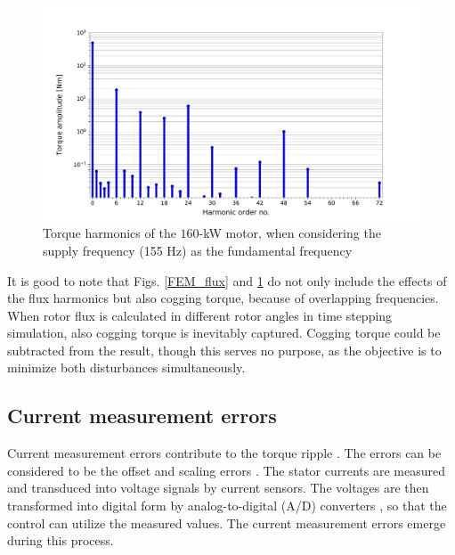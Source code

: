 \begin{figure}[ht] 
    \centering
    \includegraphics[width=1.0\linewidth]{images/fem-flux-harmonics.pdf} 
    \caption{Torque harmonics of the $160$-kW motor, when considering the supply frequency (155 Hz) as the fundamental frequency}
    \label{FEM_flux_harmonics}
\end{figure}

It is good to note that Figs. \ref{FEM_flux} and \ref{FEM_flux_harmonics} do not only include the effects of the flux harmonics but also cogging torque, because of overlapping frequencies. When rotor flux is calculated in different rotor angles in time stepping simulation, also cogging torque is inevitably captured. Cogging torque could be subtracted from the result, though this serves no purpose, as the objective is to minimize both disturbances simultaneously.


\subsection{Current measurement errors}
Current measurement errors contribute to the torque ripple \cite{current_scaling:1998, ILC:2004, ILC:2005, CTR_SW_ff:2011, ILC:2012, ILC:2018}. The errors can be considered to be the offset and scaling errors \cite{current_scaling:1998, ILC:2004, CTR_SW_ff:2011, ILC:2012}. The stator currents are measured and transduced into voltage signals by current sensors. The voltages are then transformed into digital form by analog-to-digital (A/D) converters \cite{current_scaling:1998, ILC:2005}, so that the control can utilize the measured values. The current measurement errors emerge during this process.

